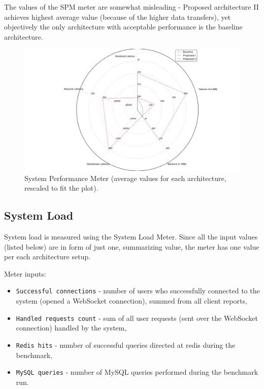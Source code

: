 \documentclass{uvamscse}
\begin{document}
The values of the SPM meter are somewhat misleading - Proposed architecture II achieves highest average value (because of the higher data transfers), yet objectively the only architecture with acceptable performance is the baseline architecture.

\begin{figure}[H]
\centering
\includegraphics[scale=0.3]{spm}
\caption{System Performance Meter (average values for each architecture, rescaled to fit the plot).}
\label{figure:spm}
\end{figure}

\subsection{System Load}
System load is measured using the System Load Meter. Since all the input values (listed below) are in form of just one, summarizing value, the meter has one value per each architecture setup.

Meter inputs:
\begin{itemize}
  \item \texttt{Successful connections} - number of users who successfully connected to the system (opened a WebSocket connection), summed from all client reports,
  \item \texttt{Handled requests count} - sum of all user requests (sent over the WebSocket connection) handled by the system,
  \item \texttt{Redis hits} - number of successful queries directed at redis during the benchmark,
  \item \texttt{MySQL queries} - number of MySQL queries performed during the benchmark run.
\end{itemize}
\end{document}
